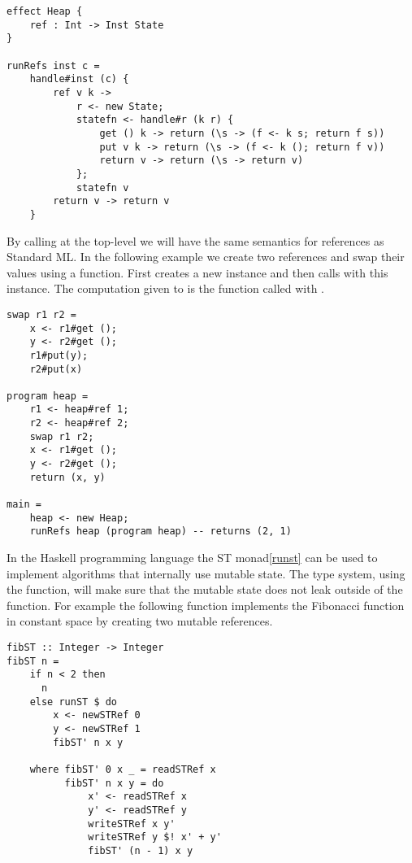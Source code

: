 \begin{verbatim}
effect Heap {
	ref : Int -> Inst State
}

runRefs inst c =
	handle#inst (c) {
		ref v k ->
			r <- new State;
			statefn <- handle#r (k r) {
				get () k -> return (\s -> (f <- k s; return f s))
				put v k -> return (\s -> (f <- k (); return f v))
				return v -> return (\s -> return v)
			};
			statefn v 
		return v -> return v
	}
\end{verbatim}

By calling  at the top-level we will have the same semantics for references as Standard ML.
In the following example we create two references and swap their values using a  function.
First  creates a new  instance  and then calls  with this instance.
The computation given to  is the function  called with .

\begin{verbatim}
swap r1 r2 =
	x <- r1#get ();
	y <- r2#get ();
	r1#put(y);
	r2#put(x)
	
program heap =
	r1 <- heap#ref 1;
	r2 <- heap#ref 2;
	swap r1 r2;
	x <- r1#get ();
	y <- r2#get ();
	return (x, y)
	
main =
	heap <- new Heap;
	runRefs heap (program heap) -- returns (2, 1)
\end{verbatim}

In the Haskell programming language the ST monad\ref{runst} can be used to implement algorithms that internally use mutable state.
The type system, using the  function, will make sure that the mutable state does not leak outside of the function.
For example the following function  implements the Fibonacci function in constant space by creating two mutable references.

\begin{verbatim}
fibST :: Integer -> Integer
fibST n = 
    if n < 2 then
      n
    else runST $ do
        x <- newSTRef 0
        y <- newSTRef 1
        fibST' n x y

    where fibST' 0 x _ = readSTRef x
          fibST' n x y = do
              x' <- readSTRef x
              y' <- readSTRef y
              writeSTRef x y'
              writeSTRef y $! x' + y'
              fibST' (n - 1) x y
\end{verbatim}

